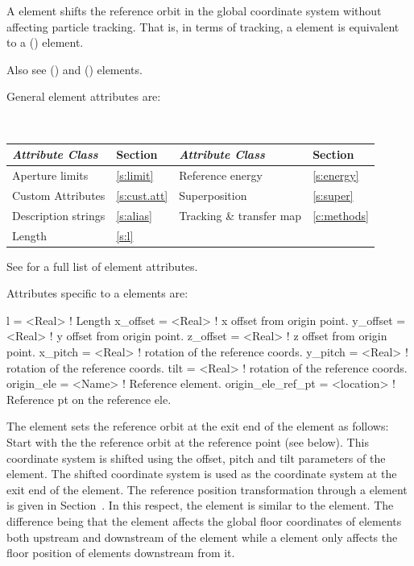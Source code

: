A  element shifts the reference orbit in the global coordinate system without
affecting particle tracking. That is, in terms of tracking, a  element is equivalent
to a  () element. 

Also see  () and  () elements.

General  element attributes are:
\begin{center}
\tt
\begin{tabular}{llll} \toprule
  {\sl Attribute Class}      & Section           & {\sl Attribute Class}      & Section         \\ \midrule
  Aperture limits            & \ref{s:limit}     & Reference energy           & \ref{s:energy}  \\
  Custom Attributes          & \ref{s:cust.att}  & Superposition              & \ref{s:super}   \\
  Description strings        & \ref{s:alias}     & Tracking \& transfer map   & \ref{c:methods} \\
  Length                     & \ref{s:l}         &                            &                 \\
  \bottomrule
\end{tabular}
\end{center}
\toffset
See  for a full list of element attributes.

Attributes specific to a  elements are:
\begin{example}
  l                 = <Real>     ! Length
  x_offset          = <Real>     ! x offset from origin point.
  y_offset          = <Real>     ! y offset from origin point.
  z_offset          = <Real>     ! z offset from origin point.
  x_pitch           = <Real>     ! rotation of the reference coords.
  y_pitch           = <Real>     ! rotation of the reference coords.
  tilt              = <Real>     ! rotation of the reference coords.
  origin_ele        = <Name>     ! Reference element.
  origin_ele_ref_pt = <location> ! Reference pt on the reference ele.
\end{example}

The  element sets the reference orbit at the exit end of the 
element as follows: Start with the the reference orbit at the  reference point (see
below). This coordinate system is shifted using the offset, pitch and tilt parameters of the
 element. The shifted coordinate system is used as the coordinate system at the exit
end of the  element. The reference position transformation through a
 element is given in Section~. In this respect, the 
element is similar to the  element. The difference being that the  element affects
the global floor coordinates of elements both upstream and downstream of the  element while a
 element only affects the floor position of elements downstream from it.
 
